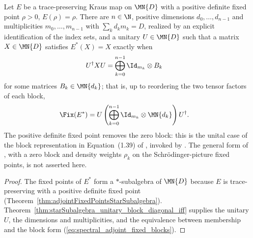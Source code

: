 \begin{theorem}%
    \label{thm:adjointFixedPoints_block_form}
    \leanok
    Let $E$ be a trace-preserving Kraus map on $\MN{D}$ with a positive
    definite fixed point $\rho>0$, $E(\rho)=\rho$. There are $n\in\N$,
    positive dimensions $d_0,\ldots,d_{n-1}$ and multiplicities
    $m_0,\ldots,m_{n-1}$ with $\sum_kd_km_k=D$, realized by an explicit
    identification of the index sets, and a unitary $U\in\MN{D}$ such that
    a matrix $X\in\MN{D}$ satisfies $E^*(X)=X$ exactly when
    \begin{align}
        U^\dagger XU
        &=\bigoplus_{k=0}^{n-1}\Id_{m_k}\otimes B_k
        \notag
    \end{align}
    for some matrices $B_k\in\MN{d_k}$; that is, up to reordering the two
    tensor factors of each block,
    \begin{align}
        \Fix(E^*)
        &=U\left(\bigoplus_{k=0}^{n-1}
          \Id_{m_k}\otimes\MN{d_k}\right)U^\dagger.
        \label{eq:spectral_adjoint_fixed_blocks}
    \end{align}
    The positive definite fixed point removes the zero block: this is the
    unital case of the block representation in Equation~(1.39) of
    \cite{Wolf2012Quantum}, invoked by
    \cite[Theorem~6.14]{Wolf2012Quantum}. The general form of
    \cite[Theorem~6.14]{Wolf2012Quantum}, with a zero block and density
    weights $\rho_k$ on the Schr\"odinger-picture fixed points, is not
    asserted here.
\end{theorem}

\begin{proof}
    \leanok
    The fixed points of $E^*$ form a $*$-subalgebra of $\MN{D}$ because
    $E$ is trace-preserving with a positive definite fixed point
    (Theorem~\ref{thm:adjointFixedPointsStarSubalgebra}).
    Theorem~\ref{thm:starSubalgebra_unitary_block_diagonal_iff} supplies
    the unitary $U$, the dimensions and multiplicities, and the equivalence
    between membership and the block form
    (\ref{eq:spectral_adjoint_fixed_blocks}).
\end{proof}

